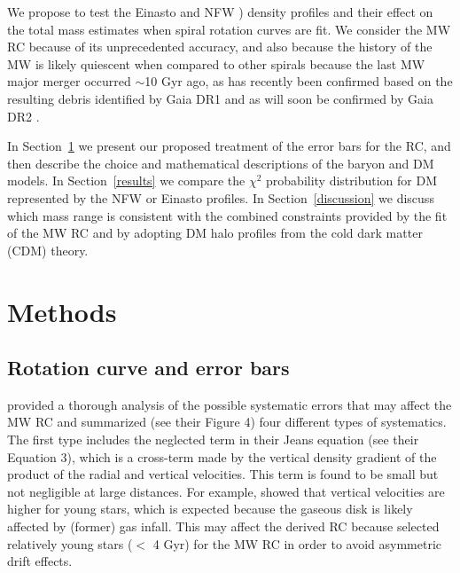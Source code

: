\documentclass{aa}
\begin{document}
We propose to test the Einasto and NFW \citep{Navarro1997}) density profiles and their effect on the total mass estimates when spiral rotation curves are fit. We consider the MW RC because of its unprecedented accuracy, and also because the history of the MW is likely quiescent when compared to other spirals \citep{Hammer2007} because the last MW major merger occurred $\sim$10 Gyr ago, as has recently been confirmed based on the resulting debris identified by Gaia DR1 \citep{Belokurov2018} and as will soon be confirmed by Gaia DR2 \citep{Haywood2018,Helmi2018}. 

In Section~\ref{methods} we present our proposed treatment of the error bars for the \citet{Eilers2019} RC, and then describe the choice and mathematical descriptions of the baryon and DM models. In Section~\ref{results} we compare the $\chi^2$ probability distribution for DM represented by the NFW or Einasto profiles. In Section~\ref{discussion} we discuss which mass range is consistent with the combined constraints provided by the fit of the MW RC and by adopting DM halo profiles from the cold dark matter (CDM) theory.



\section{Methods}
\label{methods}
\subsection{Rotation curve and error bars}
\label{sec:errs} 
\citet{Eilers2019} provided  a thorough analysis of the possible systematic errors that may affect the MW RC and summarized (see their Figure 4) four different types of systematics. The first type includes the neglected term in their Jeans equation (see their Equation 3), which is a cross-term made by the vertical density gradient of the product of the radial and vertical velocities. This term is found to be small but not negligible at large distances. For example, \citet{Mackereth2019} showed that vertical velocities are higher for young stars, which is expected because the gaseous disk is likely affected by (former) gas infall. This may affect the derived RC because \cite{Eilers2019} selected relatively young stars ($<$ 4 Gyr) for the MW RC in order to avoid asymmetric drift effects. 
\end{document}
